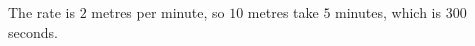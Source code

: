 The rate is $2$ metres per minute, so $10$ metres take $5$ minutes, which is $\boxed{300}$ seconds.
